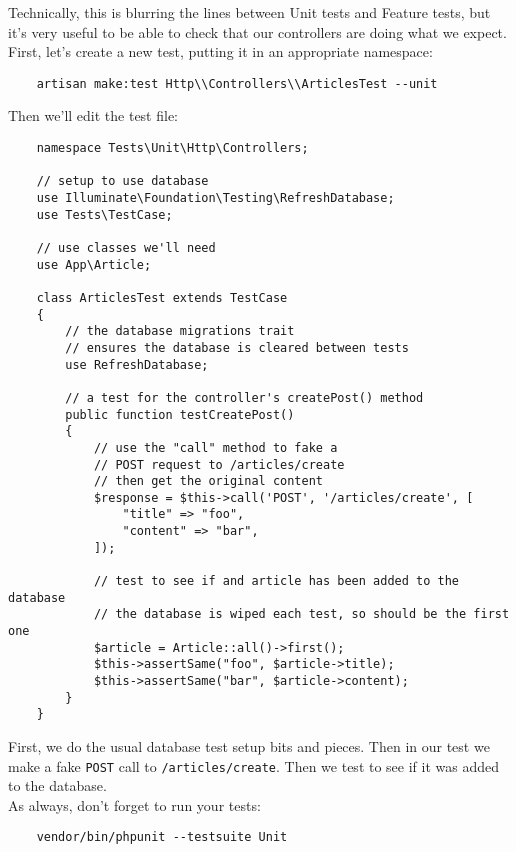 Technically, this is blurring the lines between Unit tests and Feature tests, but it's very useful to be able to check that our controllers are doing what we expect.
\\

First, let's create a new test, putting it in an appropriate namespace:

\begin{verbatim}
    artisan make:test Http\\Controllers\\ArticlesTest --unit
\end{verbatim}

Then we'll edit the test file:

\begin{verbatim}
    namespace Tests\Unit\Http\Controllers;

    // setup to use database
    use Illuminate\Foundation\Testing\RefreshDatabase;
    use Tests\TestCase;

    // use classes we'll need
    use App\Article;

    class ArticlesTest extends TestCase
    {
        // the database migrations trait
        // ensures the database is cleared between tests
        use RefreshDatabase;

        // a test for the controller's createPost() method
        public function testCreatePost()
        {
            // use the "call" method to fake a
            // POST request to /articles/create
            // then get the original content
            $response = $this->call('POST', '/articles/create', [
                "title" => "foo",
                "content" => "bar",
            ]);

            // test to see if and article has been added to the database
            // the database is wiped each test, so should be the first one
            $article = Article::all()->first();
            $this->assertSame("foo", $article->title);
            $this->assertSame("bar", $article->content);
        }
    }
\end{verbatim}

First, we do the usual database test setup bits and pieces. Then in our test we make a fake \texttt{POST} call to \texttt{/articles/create}. Then we test to see if it was added to the database.
\\

As always, don't forget to run your tests:

\begin{verbatim}
    vendor/bin/phpunit --testsuite Unit
\end{verbatim}

